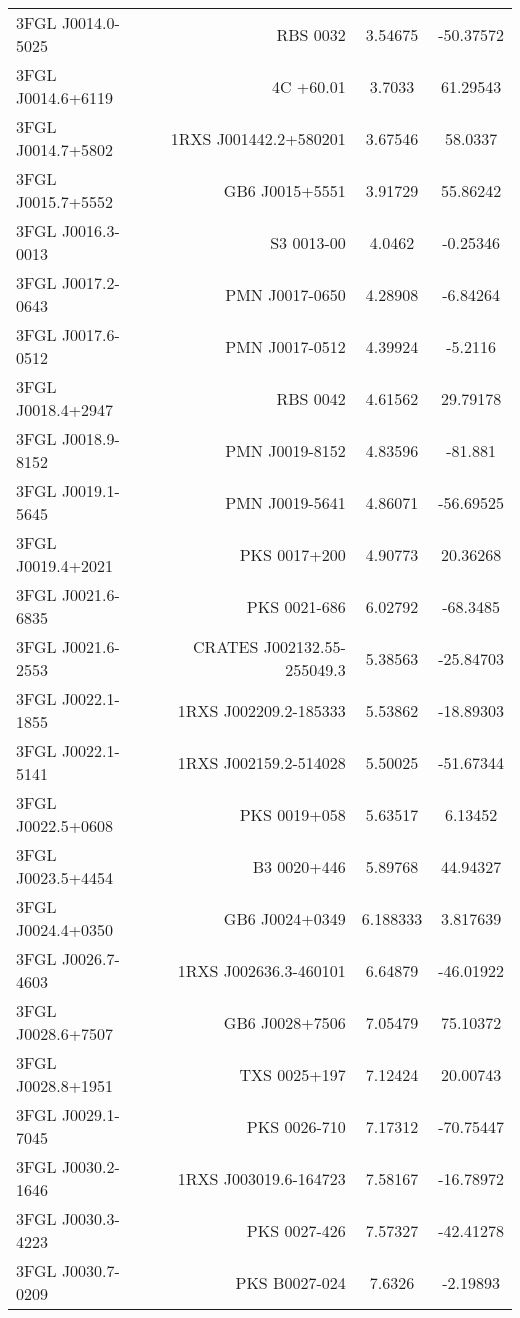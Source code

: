 \begin{table}
\begin{tabular}{l r c c}
3FGL J0014.0-5025  &  RBS 0032  &  3.54675  &  -50.37572  \\
3FGL J0014.6+6119  &  4C +60.01  &  3.7033  &  61.29543  \\
3FGL J0014.7+5802  &  1RXS J001442.2+580201  &  3.67546  &  58.0337  \\
3FGL J0015.7+5552  &  GB6 J0015+5551  &  3.91729  &  55.86242  \\
3FGL J0016.3-0013  &  S3 0013-00  &  4.0462  &  -0.25346  \\
3FGL J0017.2-0643  &  PMN J0017-0650  &  4.28908  &  -6.84264  \\
3FGL J0017.6-0512  &  PMN J0017-0512  &  4.39924  &  -5.2116  \\
3FGL J0018.4+2947  &  RBS 0042  &  4.61562  &  29.79178  \\
3FGL J0018.9-8152  &  PMN J0019-8152  &  4.83596  &  -81.881  \\
3FGL J0019.1-5645  &  PMN J0019-5641  &  4.86071  &  -56.69525  \\
3FGL J0019.4+2021  &  PKS 0017+200  &  4.90773  &  20.36268  \\
3FGL J0021.6-6835  &  PKS 0021-686  &  6.02792  &  -68.3485  \\
3FGL J0021.6-2553  &  CRATES J002132.55-255049.3  &  5.38563  &  -25.84703  \\
3FGL J0022.1-1855  &  1RXS J002209.2-185333  &  5.53862  &  -18.89303  \\
3FGL J0022.1-5141  &  1RXS J002159.2-514028  &  5.50025  &  -51.67344  \\
3FGL J0022.5+0608  &  PKS 0019+058  &  5.63517  &  6.13452  \\
3FGL J0023.5+4454  &  B3 0020+446  &  5.89768  &  44.94327  \\
3FGL J0024.4+0350  &  GB6 J0024+0349  &  6.188333  &  3.817639  \\
3FGL J0026.7-4603  &  1RXS J002636.3-460101  &  6.64879  &  -46.01922  \\
3FGL J0028.6+7507  &  GB6 J0028+7506  &  7.05479  &  75.10372  \\
3FGL J0028.8+1951  &  TXS 0025+197  &  7.12424  &  20.00743  \\
3FGL J0029.1-7045  &  PKS 0026-710  &  7.17312  &  -70.75447  \\
3FGL J0030.2-1646  &  1RXS J003019.6-164723  &  7.58167  &  -16.78972  \\
3FGL J0030.3-4223  &  PKS 0027-426  &  7.57327  &  -42.41278  \\
3FGL J0030.7-0209  &  PKS B0027-024  &  7.6326  &  -2.19893  \\

\end{tabular}
\end{table}
